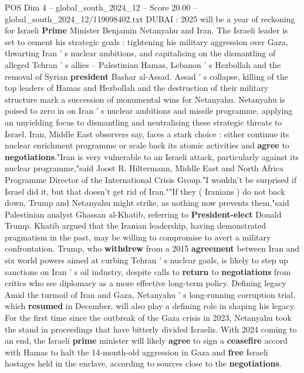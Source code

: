 \begin{textsample}{POS Dim 4 – global\_south\_2024\_12 – Score 20.00 – global\_south\_2024\_12/119098402.txt}  \label{ex:f4_pos_255}
DUBAI : 2025 will be a year of reckoning for Israeli \textbf{Prime} Minister Benjamin Netanyahu and Iran.
The Israeli leader is set to cement his strategic goals : tightening his military aggression over Gaza, thwarting Iran ' s nuclear ambitions, and capitalising on the dismantling of alleged Tehran ' s allies -- Palestinian Hamas, Lebanon ' s Hezbollah and the removal of Syrian \textbf{president} Bashar al-Assad.
Assad ' s collapse, killing of the top leaders of Hamas and Hezbollah and the destruction of their military structure mark a succession of monumental wins for Netanyahu.
Netanyahu is poised to zero in on Iran ' s nuclear ambitions and missile programme, applying an unyielding focus to dismantling and neutralising these strategic threats to Israel.
Iran, Middle East observers say, faces a stark choice : either continue its nuclear enrichment programme or scale back its atomic activities and \textbf{agree} to \textbf{negotiations}."Iran is very vulnerable to an Israeli attack, particularly against its nuclear programme,"said Joost R.
Hiltermann, Middle East and North Africa Programme Director of the International Crisis Group."I wouldn't be surprised if Israel did it, but that doesn't get rid of Iran.""If they ( Iranians ) do not back down, Trump and Netanyahu might strike, as nothing now prevents them,"said Palestinian analyst Ghassan al-Khatib, referring to \textbf{President-elect} Donald Trump.
Khatib argued that the Iranian leadership, having demonstrated pragmatism in the past, may be willing to compromise to avert a military confrontation.
Trump, who \textbf{withdrew} from a 2015 \textbf{agreement} between Iran and six world powers aimed at curbing Tehran ' s nuclear goals, is likely to step up sanctions on Iran ' s oil industry, despite calls to \textbf{return} to \textbf{negotiations} from critics who see diplomacy as a more effective long-term policy.
Defining legacy Amid the turmoil of Iran and Gaza, Netanyahu ' s long-running corruption trial, which \textbf{resumed} in December, will also play a defining role in shaping his legacy.
For the first time since the outbreak of the Gaza crisis in 2023, Netanyahu took the stand in proceedings that have bitterly divided Israelis.
With 2024 coming to an end, the Israeli \textbf{prime} minister will likely \textbf{agree} to sign a \textbf{ceasefire} accord with Hamas to halt the 14-month-old aggression in Gaza and \textbf{free} Israeli hostages held in the enclave, according to sources close to the \textbf{negotiations}.

\end{textsample}
